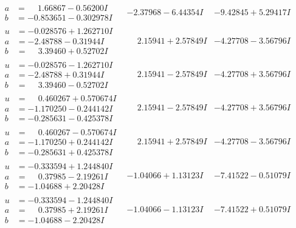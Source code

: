 \documentclass[1p]{elsarticle_modified}
\theoremstyle{definition}
\begin{document}
$$\begin{array}{c|c|c}
\begin{aligned}
a &= \phantom{-}1.66867 - 0.56200 I \\
b &= -0.853651 - 0.302978 I\end{aligned}
 & -2.37968 - 6.44354 I & -9.42845 + 5.29417 I \\ \hline\begin{aligned}
u &= -0.028576 + 1.262710 I \\
a &= -2.48788 - 0.31944 I \\
b &= \phantom{-}3.39460 + 0.52702 I\end{aligned}
 & \phantom{-}2.15941 + 2.57849 I & -4.27708 - 3.56796 I \\ \hline\begin{aligned}
u &= -0.028576 - 1.262710 I \\
a &= -2.48788 + 0.31944 I \\
b &= \phantom{-}3.39460 - 0.52702 I\end{aligned}
 & \phantom{-}2.15941 - 2.57849 I & -4.27708 + 3.56796 I \\ \hline\begin{aligned}
u &= \phantom{-}0.460267 + 0.570674 I \\
a &= -1.170250 - 0.244142 I \\
b &= -0.285631 - 0.425378 I\end{aligned}
 & \phantom{-}2.15941 - 2.57849 I & -4.27708 + 3.56796 I \\ \hline\begin{aligned}
u &= \phantom{-}0.460267 - 0.570674 I \\
a &= -1.170250 + 0.244142 I \\
b &= -0.285631 + 0.425378 I\end{aligned}
 & \phantom{-}2.15941 + 2.57849 I & -4.27708 - 3.56796 I \\ \hline\begin{aligned}
u &= -0.333594 + 1.244840 I \\
a &= \phantom{-}0.37985 - 2.19261 I \\
b &= -1.04688 + 2.20428 I\end{aligned}
 & -1.04066 + 1.13123 I & -7.41522 - 0.51079 I \\ \hline\begin{aligned}
u &= -0.333594 - 1.244840 I \\
a &= \phantom{-}0.37985 + 2.19261 I \\
b &= -1.04688 - 2.20428 I\end{aligned}
 & -1.04066 - 1.13123 I & -7.41522 + 0.51079 I \\ \hline\begin{aligned}

\end{aligned}
\end{array}$$
\end{document}
